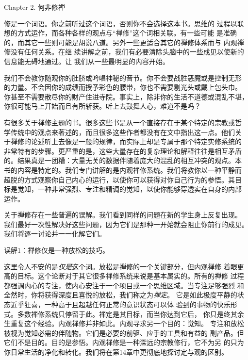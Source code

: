 


\beginchapter Chapter 2. 何非修禅


{
\parindent=3pc
\noindent\hang{}
\1%
{修是一个词语}。你之前听过这个词语，否则你不会选择这本书。思维的
过程以联想的方式运作，而各种各样的观点与“禅修”这个词相关联。有一些可能
是准确的，而其它一些则可能是胡说八道。另外一些更适合其它的禅修体系而与
内观禅修没有任何关系。在继
续讲解之前，我们有必要清除头脑中的一些成见以使新的信息能无碍地通过。让
我们从一些最明显的内容开始。

}

我们不会教你随观你的肚脐或吟唱神秘的音节。你不会要战胜恶魔或是控制无形
的力量。不会因你的成绩而授予彩色的腰带，你也不需要剔光头或戴上包头巾。
你甚至不需要散尽你的财产住进寺院。事实上，除非你的生活不道德或混乱不堪，
你很可能马上开始而且有所斩获。听上去鼓舞人心，难道不是吗？

有很多关于禅修主题的书。很多这些书是从一个直接存在于某个特定的宗教或哲
学传统中的观点来著述的，而且很多这些作者都没有在文中指出这一点。他们关
于禅修的论述听上去像是一般的规律，而实际上却是专属于那个特定实修系统的
非常\1特有的步骤。更严重的是，这些大量存在的复杂理论和解释往往是相互矛盾
的。结果真是一团糟：大量无关的数据伴随着庞大的混乱的相互冲突的观点。本
书的内容是特定的。我们专门讲解的是内观禅修系统。我们将教你以一种平静而
超脱的方式观察你自己内心的运行，以使你可以获得对你自己行为的参悟。其目
标是觉知，一种非常强烈、专注和精调的觉知，以使你能够穿透实在自身的内部
运作。

关于禅修存在一些普遍的误解。我们看到同样的问题在新的学生身上反复出现。
我们最好一次性解决好这些问题，因为它们是那种一开始就会阻止你前行的成见。
我们将逐一讨论并一一化解它们。

\subsectnon 误解1：禅修仅是一种放松的技巧。

这里令人不安的是{\it 仅是}这个词。放松是禅修的一个关键部分，但内观禅修
着眼更高的目标。这个论断对于其它很多禅修系统来说是基本属实的。所有的禅修
过程都强调内心的专注，使内心安注于一个项目或一个思维区域。当专注足够强烈
和全然时，你将获得深度且喜悦的放松，我们称之为{\it 禅定}。
它是如此极度平静的状态近乎狂喜，一种高于且超越任何正常的意识状态可以体
验到的事物的快乐形式。多数禅修系统只停留于此。禅定是其目标，而当你达到它后，
你只是终其余生重复这个经验。内观禅修\1并非如此。内观寻求另一个目的：觉知。
专注和放松被视为觉知必需的伴随物。它们是必要的前驱、应手的工具和有益的
副产品。但它们不是目的。目的是参悟。内观禅修是一种深远的宗教修行，它不为另
的只为你日常生活的净化和转化。我们将在第14章中更彻底地探讨定与观的区别。

